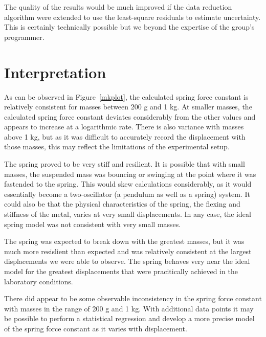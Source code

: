 \documentclass{article}
\numberwithin{figure}{section}
\numberwithin{table}{section}
\begin{document}
The quality of the results would be much improved if the data reduction algorithm were extended to use the least-square residuals to estimate uncertainty.  This is certainly technically possible but we beyond the expertise of the group's programmer.

\FloatBarrier 

\section{Interpretation} 

As can be observed in Figure~\ref{mkplot}, the calculated spring force constant is relatively consistent for masses between 200 g and 1 kg.  At smaller masses, the calculated spring force constant deviates considerably from the other values and appears to increase at a logarithmic rate.  There is also variance with masses above 1 kg, but as it was difficult to accurately record the displacement with those masses, this may reflect the limitations of the experimental setup.

The spring proved to be very stiff and resilient.  It is possible that with small masses, the suspended mass was bouncing or swinging at the point where it was fastended to the spring.  This would skew calculations considerably, as it would essentially become a two-oscillator (a pendulum as well as a spring) system.  It could also be that the physical characteristics of the spring, the flexing and stiffness of the metal, varies at very small displacements.  In any case, the ideal spring model was not consistent with very small masses.

The spring was expected to break down with the greatest masses, but it was much more resislient than expected and was relatively consistent at the largest displacements we were able to observe.  The spring behaves very near the ideal model for the greatest displacements that were pracitically achieved in the laboratory conditions.

There did appear to be some observable inconsistency in the spring force constant with masses in the range of 200 g and 1 kg.  With additional data points it may be possible to perform a statistical regression and develop a more precise model of the spring force constant as it varies with displacement.
\end{document}
